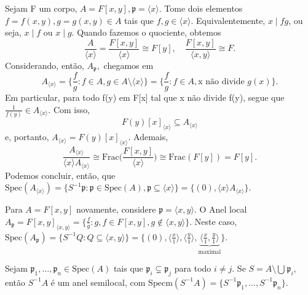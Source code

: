 \documentclass[algebraII_notes.tex]{subfiles}
\begin{document}
\begin{example}
	Sejam F um corpo, \(A = F[x, y], \mathfrak{p} = \langle x \rangle\). Tome dois elementos \(f = f(x, y), g = g(x, y)\in A\) tais que
	\(f, g\in \langle x \rangle.\) Equivalentemente, \(x\mid fg\), ou seja, \(x\mid f\) ou \(x\mid g\). Quando fazemos o quociente, obtemos
	\[
		\frac{A}{\langle x \rangle} = \frac{F[x, y]}{\langle x \rangle}\cong F[y], \quad \frac{F[x, y]}{\langle x, y \rangle}\cong F.
	\]
	Considerando, então, \(A_{\mathfrak{p}},\) chegamos em
	\[
		A_{\langle x \rangle}= \biggl\{\frac{f}{g}: f\in A, g\in A\setminus{\langle x \rangle}\biggr\} = \biggl\{\frac{f}{g}: f\in A, \text{x não divide }g(x)\biggr\}.
	\]
	Em particular, para todo f(y) em F[x] tal que x não divide f(y), segue que \(\frac{1}{f(y)}\in A_{\langle x \rangle}.\) Com isso,
	\[
		F(y)[x]_{\langle x \rangle}\subseteq A_{\langle x \rangle}
	\]
	e, portanto, \(A_{\langle x \rangle} = F(y)[x]_{\langle x \rangle}\). Ademais,
	\[
		\frac{A_{\langle x \rangle}}{\langle x \rangle A_{\langle x \rangle}} \cong \mathrm{Frac}\biggl(\frac{F[x, y]}{\langle x \rangle}\biggr) \cong \mathrm{Frac}(F[y]) = F[y].
	\]
	Podemos concluir, então, que \(\mathrm{Spec}(A_{\langle x \rangle}) = \{S^{-1}\mathfrak{p}:\mathfrak{p}\in \mathrm{Spec}(A), \mathfrak{p}\subseteq \langle x \rangle\} = \{(0), \langle x \rangle A_{\langle x \rangle}\}\).
\end{example}
\begin{example}
	Para \(A = F[x, y]\) novamente, considere \(\mathfrak{p} = \langle x, y \rangle\). O Anel local \(A_{\mathfrak{p}} = F[x, y]_{\langle x, y \rangle} = \biggl\{\frac{f}{g}: g, f\in F[x, y], g\not\in \langle x, y \rangle\biggr\}.\)
	Neste caso, \(\mathrm{Spec}(A_{\mathfrak{p}}) = \{S^{-1}Q: Q\subseteq \langle x, y \rangle\} = \{(0), \langle \frac{x}{1} \rangle, \langle \frac{y}{1} \rangle, \underbrace{\langle \frac{x}{1}, \frac{y}{1} \rangle}_{\text{maximal}}\}\).
\end{example}
\begin{prop*}[Exercício]
	Sejam \(\mathfrak{p}_{1}, \dotsc, \mathfrak{p}_{n}\in \mathrm{Spec}(A)\) tais que \(\mathfrak{p}_{i}\subsetneq \mathfrak{p}_{j} \) para todo
	\(i\neq j\). Se \(S = A\setminus{\bigcup_{}^{}\mathfrak{p}_{i}}\), então \(S^{-1}A\) é um anel semilocal, com \(\mathrm{Specm}(S^{-1}A) = \{S^{-1}\mathfrak{p}_{1}, \dotsc, S^{-1}\mathfrak{p}_{n}\}\).
\end{prop*}
\end{document}
